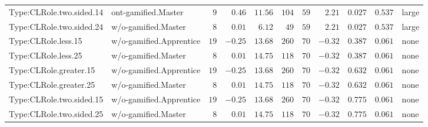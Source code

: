 \documentclass[6pt,a4paper]{article}
\begin{document}
{\begin{longtable}{llrrrrrrrrl}
Type:CLRole.two.sided.14&ont-gamified.Master&$ 9$&$ 0.46$&$11.56$&$104$&$ 59$&$ 2.21$&$0.027$&$0.537$&large\tabularnewline
Type:CLRole.two.sided.24&w/o-gamified.Master&$ 8$&$ 0.01$&$ 6.12$&$ 49$&$ 59$&$ 2.21$&$0.027$&$0.537$&large\tabularnewline
Type:CLRole.less.15&w/o-gamified.Apprentice&$19$&$-0.25$&$13.68$&$260$&$ 70$&$-0.32$&$0.387$&$0.061$&none\tabularnewline
Type:CLRole.less.25&w/o-gamified.Master&$ 8$&$ 0.01$&$14.75$&$118$&$ 70$&$-0.32$&$0.387$&$0.061$&none\tabularnewline
Type:CLRole.greater.15&w/o-gamified.Apprentice&$19$&$-0.25$&$13.68$&$260$&$ 70$&$-0.32$&$0.632$&$0.061$&none\tabularnewline
Type:CLRole.greater.25&w/o-gamified.Master&$ 8$&$ 0.01$&$14.75$&$118$&$ 70$&$-0.32$&$0.632$&$0.061$&none\tabularnewline
\newpage
Type:CLRole.two.sided.15&w/o-gamified.Apprentice&$19$&$-0.25$&$13.68$&$260$&$ 70$&$-0.32$&$0.775$&$0.061$&none\tabularnewline
Type:CLRole.two.sided.25&w/o-gamified.Master&$ 8$&$ 0.01$&$14.75$&$118$&$ 70$&$-0.32$&$0.775$&$0.061$&none\tabularnewline
\hline
\end{longtable}}
\end{document}
